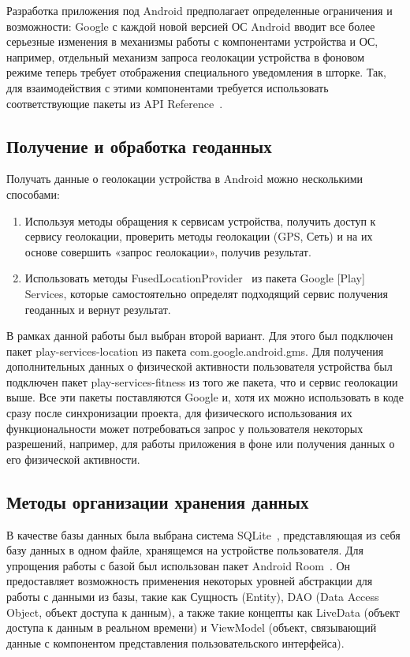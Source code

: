 Разработка приложения под Android предполагает определенные ограничения и возможности: Google с каждой новой версией ОС Android вводит все более серьезные изменения в механизмы работы с компонентами устройства и ОС, например, отдельный механизм запроса геолокации устройства в фоновом режиме теперь требует отображения специального уведомления в шторке.
Так, для взаимодействия с этими компонентами требуется использовать соответствующие пакеты из API Reference~\autocite{android_api}.


\subsection*{Получение и обработка геоданных}
\label{subsec:geodata}
Получать данные о геолокации устройства в Android можно несколькими способами:
\begin{enumerate}
	\item Используя методы обращения к сервисам устройства, получить доступ к сервису геолокации, проверить методы геолокации (GPS, Сеть) и на их основе совершить «запрос геолокации», получив результат.
	\item Использовать методы FusedLocationProvider~\autocite{android_fused_location_provider} из пакета Google [Play] Services, которые самостоятельно определят подходящий сервис получения геоданных и вернут результат.
\end{enumerate}
\smallskip
В рамках данной работы был выбран второй вариант. Для этого был подключен пакет play-services-location из пакета com.google.android.gms.
Для получения дополнительных данных о физической активности пользователя устройства был подключен пакет play-services-fitness из того же пакета, что и сервис геолокации выше.
Все эти пакеты поставляются Google и, хотя их можно использовать в коде сразу после синхронизации проекта, для физического использования их функциональности может потребоваться запрос у пользователя некоторых разрешений, например, для работы приложения в фоне или получения данных о его физической активности.


\subsection*{Методы организации хранения данных}
В качестве базы данных была выбрана система SQLite~\autocite{sqlite}, представляющая из себя базу данных в одном файле, хранящемся на устройстве пользователя.
Для упрощения работы с базой был использован пакет Android Room~\autocite{android_room}. Он предоставляет возможность применения некоторых уровней абстракции для работы с данными из базы, такие как Сущность (Entity), DAO (Data Access Object, объект доступа к данным), а также такие концепты как LiveData (объект доступа к данным в реальном времени) и ViewModel (объект, связывающий данные с компонентом представления пользовательского интерфейса).


